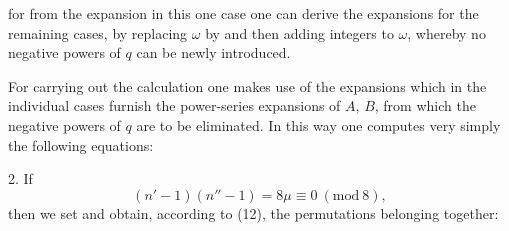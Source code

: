 for from the expansion in this one case one can derive the
expansions for the remaining cases, by replacing $\omega$
by
and then adding integers to $\omega$, whereby no negative
powers of $q$ can be newly introduced.

For carrying out the calculation one makes use of the expansions
which in the individual cases furnish the power-series expansions of $A$, $B$,
from which the negative powers of $q$ are to be eliminated. In this way
one computes very simply the following equations:

2. If
\[
(n'-1)(n''-1) = 8\mu \equiv 0 \ (\mathrm{mod}\ 8),
\]
then we set
and obtain, according to (12), the permutations belonging together:
